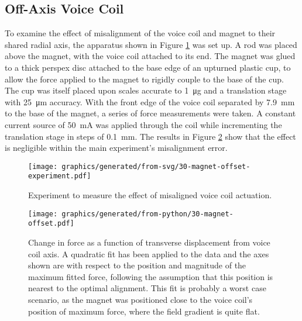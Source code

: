 \subsection{Off-Axis Voice Coil}

To examine the effect of misalignment of the voice coil and magnet to their shared radial axis, the apparatus shown in Figure \ref{fig:misaligned-voice-coil-experiment} was set up. A rod was placed above the magnet, with the voice coil attached to its end. The magnet was glued to a thick perspex disc attached to the base edge of an upturned plastic cup, to allow the force applied to the magnet to rigidly couple to the base of the cup. The cup was itself placed upon scales accurate to \SI{1}{\micro\gram} and a translation stage with \SI{25}{\micro\meter} accuracy. With the front edge of the voice coil separated by \SI{7.9}{\milli\meter} to the base of the magnet, a series of force measurements were taken. A constant current source of \SI{50}{\milli\ampere} was applied through the coil while incrementing the translation stage in steps of \SI{0.1}{\milli\meter}. The results in Figure \ref{fig:misaligned-voice-coil-results} show that the effect is negligible within the main experiment's misalignment error.


\begin{figure}
  \centering
  \texttt{[image: graphics/generated/from-svg/30-magnet-offset-experiment.pdf]}
  \caption{\label{fig:misaligned-voice-coil-experiment}Experiment to measure the effect of misaligned voice coil actuation.}
\end{figure}

\begin{figure}
  \centering
  \texttt{[image: graphics/generated/from-python/30-magnet-offset.pdf]}
  \caption{Change in force as a function of transverse displacement from voice coil axis. A quadratic fit has been applied to the data and the axes shown are with respect to the position and magnitude of the maximum fitted force, following the assumption that this position is nearest to the optimal alignment. This fit is probably a worst case scenario, as the magnet was positioned close to the voice coil's position of maximum force, where the field gradient is quite flat. }
  \label{fig:misaligned-voice-coil-results}
\end{figure}

